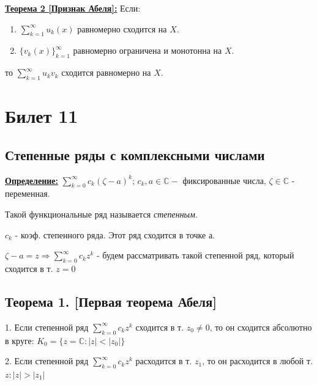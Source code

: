 \documentclass[a4paper,12pt]{article} %
\begin{document}
\underline{\textbf{Теорема 2 [Признак Абеля]:}}
Если:
\begin{enumerate}
\item  $\sum\limits_{k=1}^\infty u_k(x)$ равномерно сходится на $X$.

\item ${\{v_k(x)\}_{k=1}^\infty}$ равномерно ограничена и монотонна на $X$.
\end{enumerate}
\hspace*{40 mm}то $\sum\limits_{k=1}^{\infty} u_k v_k$ сходится равномерно на $X$.
\newpage
\section{Билет 11}
\subsection{Степенные ряды с комплексными числами}

\underline{\textbf{Определение:}} $\sum\limits_{k = 0}^\infty c_k(\zeta - a)^k$; $c_k, a \in \mathbb{C} -$ фиксированные числа, $\zeta \in \mathbb{C}$  - переменная.

Такой функциональные ряд называется \textit{степенным}.

$c_k$ - коэф. степенного ряда. Этот ряд сходится в точке а.

$\zeta - a = z \Rightarrow \sum\limits_{k = 0}^\infty c_k z^k$ - будем рассматривать такой степенной ряд, который сходится в т. $z = 0$

\subsection{Теорема 1. [Первая теорема Абеля]}

1. Если степенной ряд $\sum\limits_{k = 0}^\infty c_k z^k$ сходится в т. $z_0 \neq 0$, то он сходится абсолютно в круге: $K_0 = \{z = \mathbb{C}: |z| < |z_0|\}$

2. Если степенной ряд $\sum\limits_{k = 0}^\infty c_k z^k$ расходится в т. $z_1$, то он расходится в любой т. $z: |z| > |z_1|$ 
\end{document}
